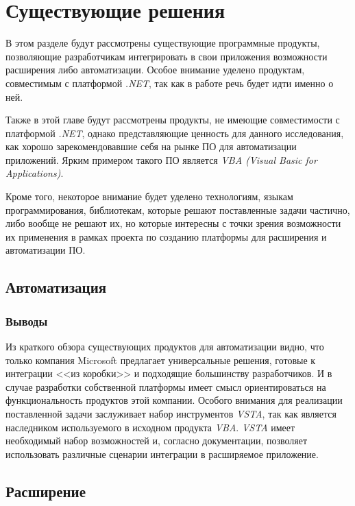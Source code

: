 \section{Существующие решения}

В этом разделе будут рассмотрены существующие программные продукты, позволяющие разработчикам интегрировать в свои приложения возможности расширения либо автоматизации. Особое внимание уделено продуктам, совместимым с платформой {\it .NET}, так как в работе речь будет идти именно о ней.

Также в этой главе будут рассмотрены продукты, не имеющие совместимости с платформой {\it .NET}, однако представляющие ценность для данного исследования, как хорошо зарекомендовавшие себя на рынке ПО для автоматизации приложений. Ярким примером такого ПО является {\it VBA (Visual Basic for Applications)}.

Кроме того, некоторое внимание будет уделено технологиям, языкам программирования, библиотекам, которые решают поставленные задачи частично, либо вообще не решают их, но которые интересны с точки зрения возможности их применения в рамках проекта по созданию платформы для расширения и автоматизации ПО.

\subsection{Автоматизация}







\subsubsection{Выводы}

Из краткого обзора существующих продуктов для автоматизации видно, что только компания Microsoft предлагает универсальные решения, готовые к интеграции <<из коробки>> и подходящие большинству разработчиков. И в случае разработки собственной платформы имеет смысл ориентироваться на функциональность продуктов этой компании. Особого внимания для реализации поставленной задачи заслуживает набор инструментов {\it VSTA}, так как является наследником используемого в исходном продукта {\it VBA}. {\it VSTA} имеет необходимый набор возможностей и, согласно документации, позволяет использовать различные сценарии интеграции в расширяемое приложение.

\subsection{Расширение}

